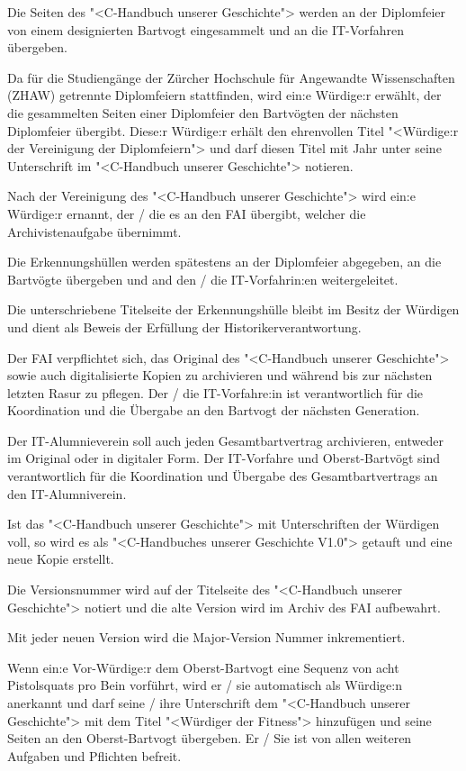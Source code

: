 \documentclass[fontsize=12pt,parskip=half]{scrartcl}
\begin{document}
\begin{contract}
  \Clause[title={Einsammlung}]\label{H.einsammlung}
  Die Seiten des "<C-Handbuch unserer Geschichte"> werden an der Diplomfeier von einem designierten Bartvogt eingesammelt und an die IT-Vorfahren übergeben.

  Da für die Studiengänge der Zürcher Hochschule für Angewandte Wissenschaften (ZHAW) getrennte Diplomfeiern stattfinden, wird ein:e Würdige:r erwählt, der die gesammelten
  Seiten einer Diplomfeier den Bartvögten der nächsten Diplomfeier übergibt. Diese:r Würdige:r erhält den ehrenvollen Titel "<Würdige:r der Vereinigung der Diplomfeiern"> und darf
  diesen Titel mit Jahr unter seine Unterschrift im "<C-Handbuch unserer Geschichte"> notieren.

  Nach der Vereinigung des "<C-Handbuch unserer Geschichte"> wird ein:e Würdige:r ernannt, der / die es an den FAI übergibt, welcher die Archivistenaufgabe  übernimmt.

  Die Erkennungshüllen werden spätestens an der Diplomfeier abgegeben, an die Bartvögte übergeben und and den / die IT-Vorfahrin:en weitergeleitet.

  Die unterschriebene Titelseite der Erkennungshülle bleibt im Besitz der Würdigen und dient als Beweis der Erfüllung der Historikerverantwortung.

  \Clause[title={Archivistenaufgabe}]\label{H.archivistenaufgabe}
  Der FAI verpflichtet sich, das Original des "<C-Handbuch unserer Geschichte"> sowie auch digitalisierte Kopien zu archivieren und während bis zur nächsten letzten Rasur
  zu pflegen. Der / die IT-Vorfahre:in ist verantwortlich für die Koordination und die Übergabe an den Bartvogt der nächsten Generation.

  Der IT-Alumnieverein soll auch jeden Gesamtbartvertrag archivieren, entweder im Original oder in digitaler Form. Der IT-Vorfahre und Oberst-Bartvögt sind verantwortlich für die Koordination
  und Übergabe des Gesamtbartvertrags an den IT-Alumniverein.

  Ist das "<C-Handbuch unserer Geschichte"> mit Unterschriften der Würdigen voll, so wird es als "<C-Handbuches unserer Geschichte V1.0"> getauft und eine neue Kopie erstellt.

  Die Versionsnummer wird auf der Titelseite des "<C-Handbuch unserer Geschichte"> notiert und die alte Version wird im Archiv des FAI aufbewahrt.

  Mit jeder neuen Version wird die Major-Version Nummer inkrementiert.

  \Clause[title={Fittnessklausel}]
  Wenn ein:e Vor-Würdige:r dem Oberst-Bartvogt eine Sequenz von acht Pistolsquats pro Bein vorführt, wird er / sie automatisch als Würdige:n anerkannt und darf seine / ihre Unterschrift
  dem "<C-Handbuch unserer Geschichte"> mit dem Titel "<Würdiger der Fitness"> hinzufügen und seine Seiten an den Oberst-Bartvogt übergeben. Er / Sie ist von allen weiteren
  Aufgaben und Pflichten befreit.


\end{contract}
\end{document}
